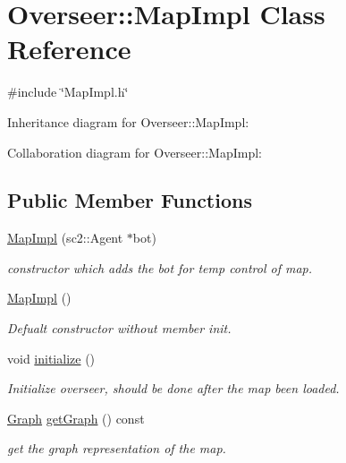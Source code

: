 \hypertarget{classOverseer_1_1MapImpl}{}\section{Overseer\+:\+:Map\+Impl Class Reference}
\label{classOverseer_1_1MapImpl}


{\ttfamily \#include \char`\"{}Map\+Impl.\+h\char`\"{}}



Inheritance diagram for Overseer\+:\+:Map\+Impl\+:


Collaboration diagram for Overseer\+:\+:Map\+Impl\+:
\subsection*{Public Member Functions}
\begin{DoxyCompactItemize}
\item 
\hyperlink{classOverseer_1_1MapImpl_a9c30887c6f342971fabd54d23b36a765}{Map\+Impl} (sc2\+::\+Agent $\ast$bot)
\begin{DoxyCompactList}\small\item\em constructor which adds the bot for temp control of map. \end{DoxyCompactList}\item 
\mbox{\label{classOverseer_1_1MapImpl_a651f28679bdd2105ef20571adf54c0c5}} 
\hyperlink{classOverseer_1_1MapImpl_a651f28679bdd2105ef20571adf54c0c5}{Map\+Impl} ()
\begin{DoxyCompactList}\small\item\em Defualt constructor without member init. \end{DoxyCompactList}\item 
\mbox{\label{classOverseer_1_1MapImpl_a91b4a03727f19c68c8ae390d2e5b248e}} 
void \hyperlink{classOverseer_1_1MapImpl_a91b4a03727f19c68c8ae390d2e5b248e}{initialize} ()
\begin{DoxyCompactList}\small\item\em Initialize overseer, should be done after the map been loaded. \end{DoxyCompactList}\item 
\mbox{\label{classOverseer_1_1MapImpl_ae08447a96779ab1c12cca3968114c50a}} 
\hyperlink{classOverseer_1_1Graph}{Graph} \hyperlink{classOverseer_1_1MapImpl_ae08447a96779ab1c12cca3968114c50a}{get\+Graph} () const
\begin{DoxyCompactList}\small\item\em get the graph representation of the map. \end{DoxyCompactList}\end{DoxyCompactItemize}
